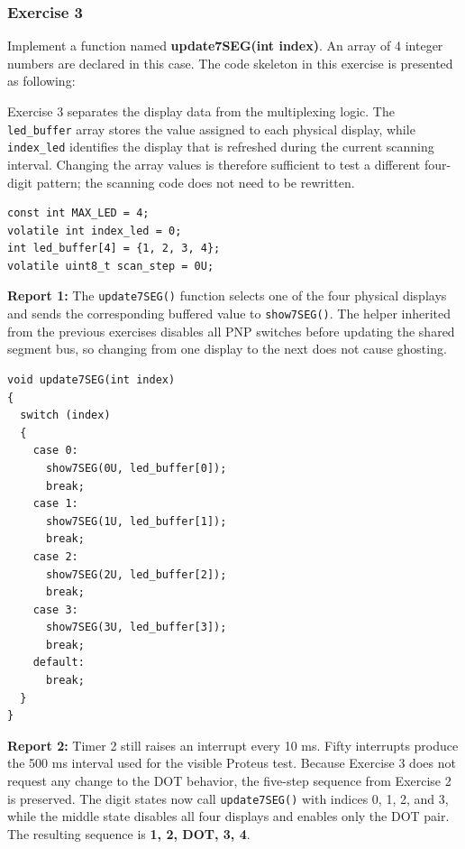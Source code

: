 \subsubsection{Exercise 3}
Implement a function named \textbf{update7SEG(int index)}. An array of 4 integer numbers are declared in this case. The code skeleton in this exercise is presented as following:

Exercise 3 separates the display data from the multiplexing logic. The \texttt{led\_buffer} array stores the value assigned to each physical display, while \texttt{index\_led} identifies the display that is refreshed during the current scanning interval. Changing the array values is therefore sufficient to test a different four-digit pattern; the scanning code does not need to be rewritten.

\begin{lstlisting}[caption={Display buffer and scanning index for Exercise 3}]
const int MAX_LED = 4;
volatile int index_led = 0;
int led_buffer[4] = {1, 2, 3, 4};
volatile uint8_t scan_step = 0U;
\end{lstlisting}

\textbf{Report 1: } The \texttt{update7SEG()} function selects one of the four physical displays and sends the corresponding buffered value to \texttt{show7SEG()}. The helper inherited from the previous exercises disables all PNP switches before updating the shared segment bus, so changing from one display to the next does not cause ghosting.

\begin{lstlisting}[caption={Implementation of update7SEG for Exercise 3}]
void update7SEG(int index)
{
  switch (index)
  {
    case 0:
      show7SEG(0U, led_buffer[0]);
      break;
    case 1:
      show7SEG(1U, led_buffer[1]);
      break;
    case 2:
      show7SEG(2U, led_buffer[2]);
      break;
    case 3:
      show7SEG(3U, led_buffer[3]);
      break;
    default:
      break;
  }
}
\end{lstlisting}

\textbf{Report 2: } Timer 2 still raises an interrupt every 10 ms. Fifty interrupts produce the 500 ms interval used for the visible Proteus test. Because Exercise 3 does not request any change to the DOT behavior, the five-step sequence from Exercise 2 is preserved. The digit states now call \texttt{update7SEG()} with indices 0, 1, 2, and 3, while the middle state disables all four displays and enables only the DOT pair. The resulting sequence is \textbf{1, 2, DOT, 3, 4}.

